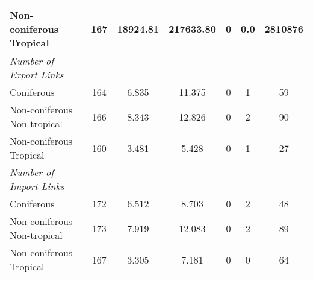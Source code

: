 \documentclass[a4paper,12pt]{article}
\begin{document}
\begin{table}[htbp]
\begin{tabular}{lcccccc}
Non-coniferous Tropical & 167 & 18924.81 & 217633.80 & 0 & 0.0 & 2810876\\

\midrule
\emph{Number of Export Links}\\
Coniferous & 164 & 6.835 & 11.375 & 0 & 1 & 59\\

Non-coniferous Non-tropical & 166 & 8.343 & 12.826 & 0 & 2 & 90\\

Non-coniferous Tropical & 160 & 3.481 & 5.428 & 0 & 1 & 27\\
\midrule
\emph{Number of Import Links}\\
Coniferous & 172 & 6.512 & 8.703 & 0 & 2 & 48\\

Non-coniferous Non-tropical & 173 & 7.919 & 12.083 & 0 & 2 & 89\\
Non-coniferous Tropical & 167 & 3.305 & 7.181 & 0 & 0 & 64\\
\midrule \midrule
        \end{tabular}
        \label{tab:summary_stat}
 \end{table}
\end{document}
